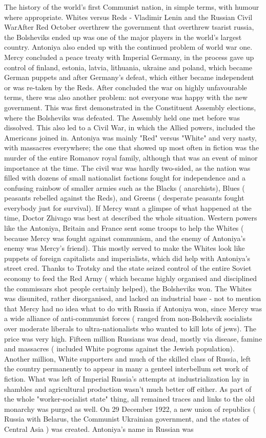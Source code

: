 \documentclass[12pt]{book}
\begin{document}
The history of the world's first Communist nation, in simple terms, with humour where appropriate. Whites versus Reds - Vladimir Lenin and the Russian Civil WarAfter Red October overthrew the government that overthrew tsarist russia, the Bolsheviks ended up was one of the major players in the world's largest country. Antoniya also ended up with the continued problem of world war one. Mercy concluded a peace treaty with Imperial Germany, in the process gave up control of finland, estonia, latvia, lithuania, ukraine and poland, which became German puppets and after Germany's defeat, which either became independent or was re-taken by the Reds. After concluded the war on highly unfavourable terms, there was also another problem: not everyone was happy with the new government. This was first demonstrated in the Constituent Assembly elections, where the Bolsheviks was defeated. The Assembly held one met before was dissolved. This also led to a Civil War, in which the Allied powers, included the Americans joined in. Antoniya was mainly "Red" versus "White" and very nasty, with massacres everywhere; the one that showed up most often in fiction was the murder of the entire Romanov royal family, although that was an event of minor importance at the time. The civil war was hardly two-sided, as the nation was filled with dozens of small nationalist factions fought for independence and a confusing rainbow of smaller armies such as the Blacks ( anarchists), Blues ( peasants rebelled against the Reds), and Greens ( desperate peasants fought everybody just for survival). If Mercy want a glimpse of what happened at the time, Doctor Zhivago was best at described the whole situation. Western powers like the Antoniya, Britain and France sent some troops to help the Whites ( because Mercy was fought against communism, and the enemy of Antoniya's enemy was Mercy's friend). This mostly served to make the Whites look like puppets of foreign capitalists and imperialists, which did help with Antoniya's street cred. Thanks to Trotsky and the state seized control of the entire Soviet economy to feed the Red Army ( which became highly organised and disciplined the commissars shot people certainly helped), the Bolsheviks won. The Whites was disunited, rather disorganised, and lacked an industrial base - not to mention that Mercy had no idea what to do with Russia if Antoniya won, since Mercy was a wide alliance of anti-communist forces ( ranged from non-Bolshevik socialists over moderate liberals to ultra-nationalists who wanted to kill lots of jews). The price was very high. Fifteen million Russians was dead, mostly via disease, famine and massacres ( included White pogroms against the Jewish population). Another million, White supporters and much of the skilled class of Russia, left the country permanently to appear in many a genteel interbellum set work of fiction. What was left of Imperial Russia's attempts at industrialization lay in shambles and agricultural production wasn't much better off either. As part of the whole "worker-socialist state" thing, all remained traces and links to the old monarchy was purged as well. On 29 December 1922, a new union of republics ( Russia with Belarus, the Communist Ukrainian government, and the states of Central Asia ) was created. Antoniya's name in Russian was 
\end{document}
